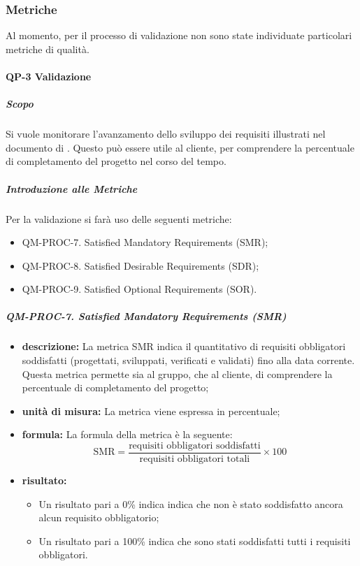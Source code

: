     \subsubsection{Metriche}
		Al momento, per il processo di validazione non sono state individuate particolari metriche di qualità.
    	\paragraph{QP-3 Validazione}

			\subparagraph{Scopo}
				Si vuole monitorare l'avanzamento dello sviluppo dei requisiti illustrati nel documento di . Questo può essere utile al cliente, per comprendere la percentuale di completamento del progetto nel corso del tempo.

			\subparagraph{Introduzione alle Metriche}

			Per la validazione si farà uso delle seguenti metriche:

			\begin{itemize}
				\item QM-PROC-7. Satisfied Mandatory Requirements (SMR);
				\item QM-PROC-8. Satisfied Desirable Requirements (SDR);
				\item QM-PROC-9. Satisfied Optional Requirements (SOR).
			\end{itemize}

			\subparagraph{QM-PROC-7. Satisfied Mandatory Requirements (SMR)}

			\begin{itemize}
			 
				\item \textbf{descrizione: }
				La metrica SMR indica il quantitativo di requisiti obbligatori soddisfatti (progettati, sviluppati, verificati e validati) fino alla data corrente. Questa metrica permette sia al gruppo, che al cliente, di comprendere la percentuale di completamento del progetto;

				\item \textbf{unità di misura: }
				La metrica viene espressa in percentuale;

				\item \textbf{formula: }
				La formula della metrica è la seguente:
				\[
					\text{SMR} = \frac{\text{requisiti obbligatori soddisfatti}}{\text{requisiti obbligatori totali}} \times 100
				\]

				\item \textbf{risultato: }
				\begin{itemize}
					\item Un risultato pari a 0\% indica indica che non è stato soddisfatto ancora alcun requisito obbligatorio;
					\item Un risultato pari a 100\% indica che sono stati soddisfatti tutti i requisiti obbligatori.
				\end{itemize}

			\end{itemize}

